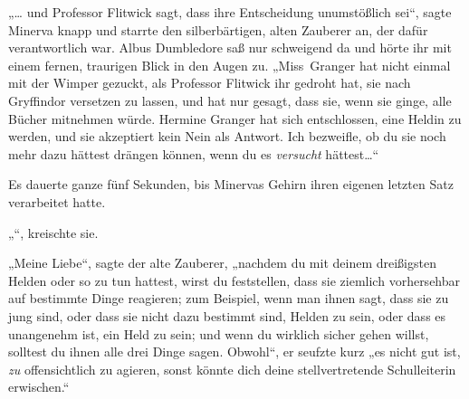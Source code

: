 
„… und Professor Flitwick sagt, dass ihre Entscheidung unumstößlich sei“, sagte Minerva knapp und starrte den silberbärtigen, alten Zauberer an, der dafür verantwortlich war. Albus Dumbledore saß nur schweigend da und hörte ihr mit einem fernen, traurigen Blick in den Augen zu. „Miss~Granger hat nicht einmal mit der Wimper gezuckt, als Professor Flitwick ihr gedroht hat, sie nach Gryffindor versetzen zu lassen, und hat nur gesagt, dass sie, wenn sie ginge, alle Bücher mitnehmen würde. Hermine Granger hat sich entschlossen, eine Heldin zu werden, und sie akzeptiert kein Nein als Antwort. Ich bezweifle, ob du sie noch mehr dazu hättest drängen können, wenn du es \emph{versucht} hättest…“

Es dauerte ganze fünf Sekunden, bis Minervas Gehirn ihren eigenen letzten Satz verarbeitet hatte.

„“, kreischte sie.

„Meine Liebe“, sagte der alte Zauberer, „nachdem du mit deinem dreißigsten Helden oder so zu tun hattest, wirst du feststellen, dass sie ziemlich vorhersehbar auf bestimmte Dinge reagieren; zum Beispiel, wenn man ihnen sagt, dass sie zu jung sind, oder dass sie nicht dazu bestimmt sind, Helden zu sein, oder dass es unangenehm ist, ein Held zu sein; und wenn du wirklich sicher gehen willst, solltest du ihnen alle drei Dinge sagen. Obwohl“, er seufzte kurz „es nicht gut ist, \emph{zu} offensichtlich zu agieren, sonst könnte dich deine stellvertretende Schulleiterin erwischen.“

